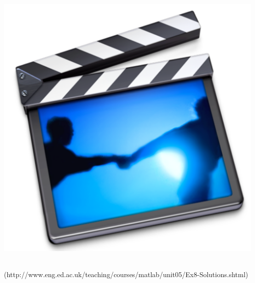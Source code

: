 {\begin{minipage}{\linewidth}
\begin{minipage}{6mm}
\includegraphics[scale=0.03]{Graphics/General/screencast_icon}
\end{minipage}
\href{http://www.eng.ed.ac.uk/teaching/courses/matlab/unit05/Ex8-Solutions.shtml}{}\\
(http://www.eng.ed.ac.uk/teaching/courses/matlab/unit05/Ex8-Solutions.shtml)
\end{minipage}%
}\\
\addtolength{\parindent}{4mm}

